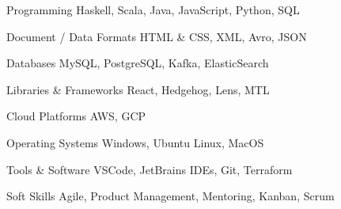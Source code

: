 


\begin{cvskills}


\cvskill
{Programming} %
{Haskell, Scala, Java, JavaScript, Python, SQL} %


\cvskill
{Document / Data Formats} %
{HTML \& CSS, XML, Avro, JSON} %


\cvskill
{Databases} %
{MySQL, PostgreSQL, Kafka, ElasticSearch} %



\cvskill
{Libraries \& Frameworks} %
{React, Hedgehog, Lens, MTL} %


\cvskill
{Cloud Platforms} %
{AWS, GCP} %


\cvskill
{Operating Systems} %
{Windows, Ubuntu Linux, MacOS} %


\cvskill
{Tools \& Software} %
{VSCode, JetBrains IDEs, Git, Terraform} %


\cvskill
{Soft Skills} %
{Agile, Product Management, Mentoring, Kanban, Scrum} %


\end{cvskills}